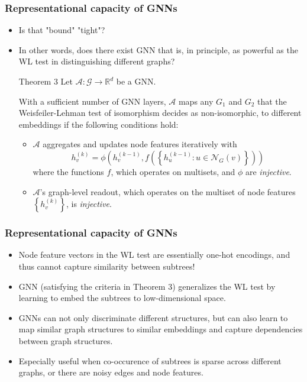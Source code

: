 \documentclass{beamer}
\begin{document}
\begin{frame}
\frametitle{Representational capacity of GNNs}

\begin{itemize}
	\item Is that "bound" "tight"? \pause
	
	\item In other words, does there exist GNN that is, in principle, as powerful as the WL test in distinguishing different graphs? \pause

\begin{block}{Theorem 3}
Let $\mathcal{A} : \mathcal{G} \rightarrow \mathbb{R}^d$ be a GNN.

With a sufficient number of GNN layers, $\mathcal{A}$ maps any $G_1$ and $G_2$ that the Weisfeiler-Lehman test of isomorphism decides as non-isomorphic, to different embeddings if the following conditions hold:

\begin{itemize}
\item $\mathcal{A}$ aggregates and updates node features iteratively with
$$h_v^{(k)} = \phi \left( h_v^{(k - 1)}, f \left( \left\{ h_u^{(k - 1)} : u \in \mathcal{N}_G(v) \right\} \right) \right)$$
where the functions $f$, which operates on multisets, and $\phi$ are {\it injective}.
\item $\mathcal{A}$'s graph-level readout, which operates on the multiset of node features $\left\{ h_v^{(k)} \right\}$, is {\it injective}.
\end{itemize}
\end{block}
\end{itemize}

\end{frame}

\begin{frame}
\frametitle{Representational capacity of GNNs}

\begin{itemize}
	\item Node feature vectors in the WL test are essentially one-hot encodings, and thus cannot capture similarity between subtrees! \pause
	
	\item GNN (satisfying the criteria in Theorem 3) generalizes the WL test by \alert{learning to embed} the subtrees to low-dimensional space. \pause
	
	\item GNNs can not only discriminate different structures, but can also learn to map similar graph structures to similar embeddings and capture dependencies between graph structures. \pause
	
	\item Especially useful when co-occurence of subtrees is sparse across different graphs, or there are noisy edges and node features.
\end{itemize}

\end{frame}
\end{document}
